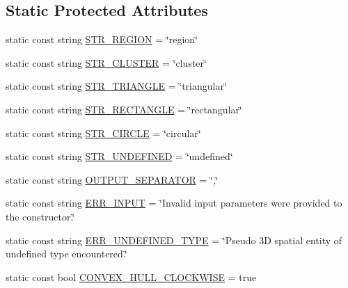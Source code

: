 \subsection*{\-Static \-Protected \-Attributes}
\begin{DoxyCompactItemize}
\item 
static const string \hyperlink{classmultiscale_1_1analysis_1_1SpatialEntityPseudo3D_a30d78540776d80a96e8cfe16645cf50a}{\-S\-T\-R\-\_\-\-R\-E\-G\-I\-O\-N} = \char`\"{}region\char`\"{}
\item 
static const string \hyperlink{classmultiscale_1_1analysis_1_1SpatialEntityPseudo3D_aa7104d49e4b42c312a942c4795353f10}{\-S\-T\-R\-\_\-\-C\-L\-U\-S\-T\-E\-R} = \char`\"{}cluster\char`\"{}
\item 
static const string \hyperlink{classmultiscale_1_1analysis_1_1SpatialEntityPseudo3D_a8ad67f0073da808ad1badedf2e613ed3}{\-S\-T\-R\-\_\-\-T\-R\-I\-A\-N\-G\-L\-E} = \char`\"{}triangular\char`\"{}
\item 
static const string \hyperlink{classmultiscale_1_1analysis_1_1SpatialEntityPseudo3D_a9b80a7c37a8c82fed02a1e23b1173843}{\-S\-T\-R\-\_\-\-R\-E\-C\-T\-A\-N\-G\-L\-E} = \char`\"{}rectangular\char`\"{}
\item 
static const string \hyperlink{classmultiscale_1_1analysis_1_1SpatialEntityPseudo3D_a561e862c97a4717eb5b4977c55d05d90}{\-S\-T\-R\-\_\-\-C\-I\-R\-C\-L\-E} = \char`\"{}circular\char`\"{}
\item 
static const string \hyperlink{classmultiscale_1_1analysis_1_1SpatialEntityPseudo3D_ae4e33ad9bcad430b929b601c5571a6fd}{\-S\-T\-R\-\_\-\-U\-N\-D\-E\-F\-I\-N\-E\-D} = \char`\"{}undefined\char`\"{}
\item 
static const string \hyperlink{classmultiscale_1_1analysis_1_1SpatialEntityPseudo3D_a4ee08be9b4119b90f0a996704d179635}{\-O\-U\-T\-P\-U\-T\-\_\-\-S\-E\-P\-A\-R\-A\-T\-O\-R} = \char`\"{},\char`\"{}
\item 
static const string \hyperlink{classmultiscale_1_1analysis_1_1SpatialEntityPseudo3D_a5882e2e18343ccee821f1bd6b9c23724}{\-E\-R\-R\-\_\-\-I\-N\-P\-U\-T} = \char`\"{}\-Invalid input parameters were provided to the constructor.\char`\"{}
\item 
static const string \hyperlink{classmultiscale_1_1analysis_1_1SpatialEntityPseudo3D_ad16aacdb05ba1922124c6b6c76077d32}{\-E\-R\-R\-\_\-\-U\-N\-D\-E\-F\-I\-N\-E\-D\-\_\-\-T\-Y\-P\-E} = \char`\"{}\-Pseudo 3\-D spatial entity of undefined type encountered.\char`\"{}
\item 
static const bool \hyperlink{classmultiscale_1_1analysis_1_1SpatialEntityPseudo3D_ad92f43d2b14c77def3f7a70b54810dd2}{\-C\-O\-N\-V\-E\-X\-\_\-\-H\-U\-L\-L\-\_\-\-C\-L\-O\-C\-K\-W\-I\-S\-E} = true
\end{DoxyCompactItemize}
